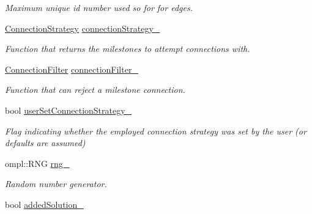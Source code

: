 \begin{DoxyCompactItemize}
\begin{DoxyCompactList}\small\item\em \-Maximum unique id number used so for for edges. \end{DoxyCompactList}\item 
\hypertarget{class_f_i_r_m_a0fcb0aef9c9101c4569f5b6bb5f576ae}{\hyperlink{class_f_i_r_m_a15cfbcaf52c0bdd5e6c1a969bbf7ea1e}{\-Connection\-Strategy} \hyperlink{class_f_i_r_m_a0fcb0aef9c9101c4569f5b6bb5f576ae}{connection\-Strategy\-\_\-}}\label{class_f_i_r_m_a0fcb0aef9c9101c4569f5b6bb5f576ae}

\begin{DoxyCompactList}\small\item\em \-Function that returns the milestones to attempt connections with. \end{DoxyCompactList}\item 
\hypertarget{class_f_i_r_m_a0ad7ac389f9e8b0e483826833c32da95}{\hyperlink{class_f_i_r_m_a2482eee2e5248d5bff3b3b56e5a593b3}{\-Connection\-Filter} \hyperlink{class_f_i_r_m_a0ad7ac389f9e8b0e483826833c32da95}{connection\-Filter\-\_\-}}\label{class_f_i_r_m_a0ad7ac389f9e8b0e483826833c32da95}

\begin{DoxyCompactList}\small\item\em \-Function that can reject a milestone connection. \end{DoxyCompactList}\item 
\hypertarget{class_f_i_r_m_a42cc77417338d946478f5a71e6bd5b70}{bool \hyperlink{class_f_i_r_m_a42cc77417338d946478f5a71e6bd5b70}{user\-Set\-Connection\-Strategy\-\_\-}}\label{class_f_i_r_m_a42cc77417338d946478f5a71e6bd5b70}

\begin{DoxyCompactList}\small\item\em \-Flag indicating whether the employed connection strategy was set by the user (or defaults are assumed) \end{DoxyCompactList}\item 
\hypertarget{class_f_i_r_m_a2e91a5d8aba0ccaca892fb9eeda4ef41}{ompl\-::\-R\-N\-G \hyperlink{class_f_i_r_m_a2e91a5d8aba0ccaca892fb9eeda4ef41}{rng\-\_\-}}\label{class_f_i_r_m_a2e91a5d8aba0ccaca892fb9eeda4ef41}

\begin{DoxyCompactList}\small\item\em \-Random number generator. \end{DoxyCompactList}\item 
\hypertarget{class_f_i_r_m_afc413ddef9b66cd337c0e19c6ba79d84}{bool \hyperlink{class_f_i_r_m_afc413ddef9b66cd337c0e19c6ba79d84}{added\-Solution\-\_\-}}\label{class_f_i_r_m_afc413ddef9b66cd337c0e19c6ba79d84}


\end{DoxyCompactItemize}
